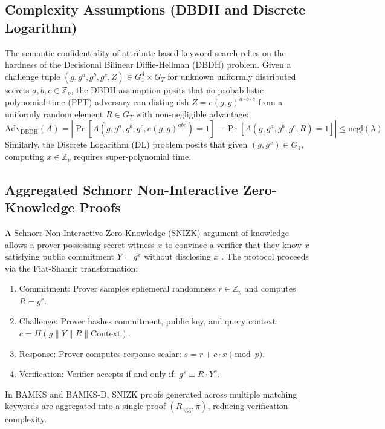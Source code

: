 \documentclass[journal,10pt,twocolumn]{IEEEtran}
\begin{document}
\subsection{Complexity Assumptions (DBDH and Discrete Logarithm)}
The semantic confidentiality of attribute-based keyword search relies on the hardness of the Decisional Bilinear Diffie-Hellman (DBDH) problem. Given a challenge tuple $(g, g^a, g^b, g^c, Z) \in G_1^4 \times G_T$ for unknown uniformly distributed secrets $a, b, c \in \mathbb{Z}_p$, the DBDH assumption posits that no probabilistic polynomial-time (PPT) adversary can distinguish $Z = e(g, g)^{a \cdot b \cdot c}$ from a uniformly random element $R \in G_T$ with non-negligible advantage:
\begin{equation}
\text{Adv}_{\text{DBDH}}(A) = |\Pr[A(g, g^a, g^b, g^c, e(g, g)^{abc}) = 1] - \Pr[A(g, g^a, g^b, g^c, R) = 1]| \le \text{negl}(\lambda)
\end{equation}
Similarly, the Discrete Logarithm (DL) problem posits that given $(g, g^x) \in G_1$, computing $x \in \mathbb{Z}_p$ requires super-polynomial time.

\subsection{Aggregated Schnorr Non-Interactive Zero-Knowledge Proofs}
A Schnorr Non-Interactive Zero-Knowledge (SNIZK) argument of knowledge allows a prover possessing secret witness $x$ to convince a verifier that they know $x$ satisfying public commitment $Y = g^x$ without disclosing $x$ \cite{schnorr1991}. The protocol proceeds via the Fiat-Shamir transformation:
\begin{enumerate}
    \item Commitment: Prover samples ephemeral randomness $r \in \mathbb{Z}_p$ and computes $R = g^r$.
    \item Challenge: Prover hashes commitment, public key, and query context: $c = H(g \parallel Y \parallel R \parallel \text{Context})$.
    \item Response: Prover computes response scalar: $s = r + c \cdot x \pmod p$.
    \item Verification: Verifier accepts if and only if: $g^s \equiv R \cdot Y^c$.
\end{enumerate}
In BAMKS and BAMKS-D, SNIZK proofs generated across multiple matching keywords are aggregated into a single proof $(R_{\text{agg}}, \hat{\pi})$, reducing verification complexity.
\end{document}
